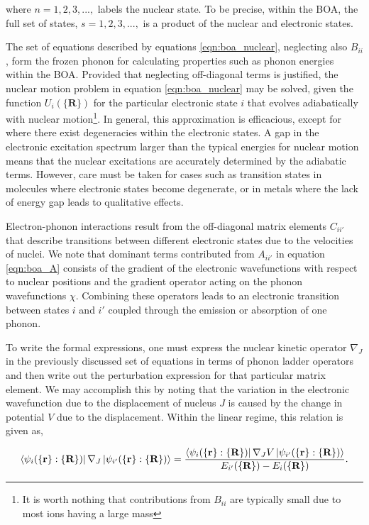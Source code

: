 where $n=1,2,3,...,$ labels the nuclear state. To be precise, within the BOA, the full set of states, $s=1,2,3,...,$ is a product of the nuclear and electronic states.

The set of equations described by equations \ref{eqn:boa_nuclear}, neglecting also $B_{ii}$, form the frozen phonon for calculating properties such as phonon energies within the BOA. Provided that neglecting off-diagonal terms is justified, the nuclear motion problem in equation \ref{eqn:boa_nuclear}  may be solved, given the function $U_{i}( \{ \textbf{R} \} )$ for the particular electronic state $i$ that evolves adiabatically with nuclear motion\footnote{It is worth nothing that contributions from $B_{ii}$ are typically small due to most ions having a large mass}. In general, this approximation is efficacious, except for where there exist degeneracies within the electronic states. A gap in the electronic excitation spectrum larger than the typical energies for nuclear motion means that the nuclear excitations are accurately determined by the adiabatic terms. However, care must be taken for cases such as transition states in molecules where electronic states become degenerate, or in metals where the lack of energy gap leads to qualitative effects.

Electron-phonon interactions result from the off-diagonal matrix elements $C_{ii'}$ that describe transitions between different electronic states due to the velocities of nuclei. We note that dominant terms contributed from $A_{ii'}$ in equation \ref{eqn:boa_A} consists of the gradient of the electronic wavefunctions with respect to nuclear positions and the gradient operator acting on the phonon wavefunctions $\chi$. Combining these operators leads to an electronic transition between states $i$ and $i'$ coupled through the emission or absorption of one phonon.

To write the formal expressions, one must express the nuclear kinetic operator $\nabla_{J}$ in the previously discussed set of equations in terms of phonon ladder operators and then write out the perturbation expression for that particular matrix element. We may accomplish this by noting that the variation in the electronic wavefunction due to the displacement of nucleus $J$ is caused by the change in potential $V$ due to the displacement. Within the linear regime, this relation is given as,

\begin{equation}
    \bra{\psi_{i}(\{ \textbf{r} \} : \{ \textbf{R} \})} \nabla_{J} \ket{ \psi_{i'}(\{ \textbf{r} \} : \{ \textbf{R} \}) } = \frac{ \bra{\psi_{i}(\{ \textbf{r} \} : \{ \textbf{R} \})} \nabla_{J} V\ket{ \psi_{i'}(\{ \textbf{r} \} : \{ \textbf{R} \}) } }{ E_{i'}(\{ \textbf{R} \}) - E_{i}( \{ \textbf{R} \}) }.
    \label{eqn:boa_ele-pho}
\end{equation}

